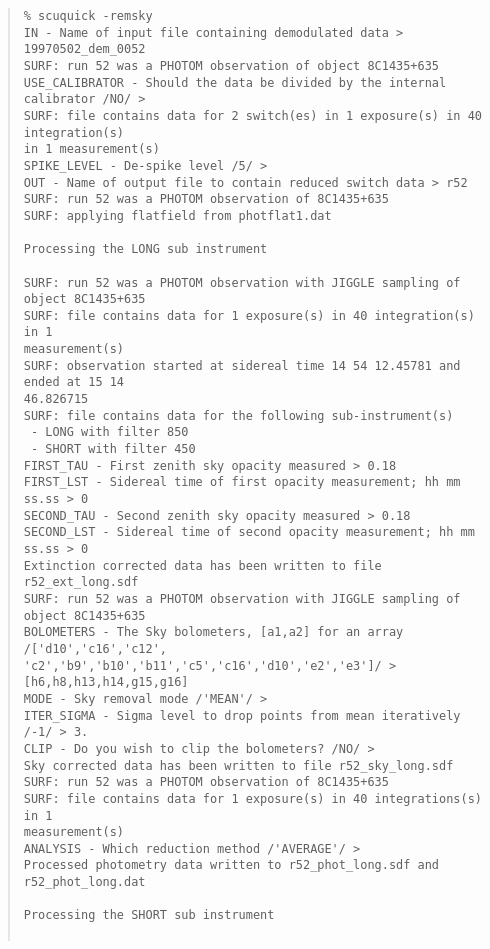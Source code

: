 \documentclass[twoside,11pt,fleqn]{article}
\newenvironment{myquote}{\begin{quote}\begin{small}}{\end{small}\end{quote}}
\begin{document}
\begin{myquote}
\begin{verbatim}
% scuquick -remsky
IN - Name of input file containing demodulated data > 19970502_dem_0052
SURF: run 52 was a PHOTOM observation of object 8C1435+635
USE_CALIBRATOR - Should the data be divided by the internal calibrator /NO/ > 
SURF: file contains data for 2 switch(es) in 1 exposure(s) in 40 integration(s)
in 1 measurement(s)
SPIKE_LEVEL - De-spike level /5/ > 
OUT - Name of output file to contain reduced switch data > r52
SURF: run 52 was a PHOTOM observation of 8C1435+635
SURF: applying flatfield from photflat1.dat
 
Processing the LONG sub instrument
 
SURF: run 52 was a PHOTOM observation with JIGGLE sampling of object 8C1435+635
SURF: file contains data for 1 exposure(s) in 40 integration(s) in 1
measurement(s)
SURF: observation started at sidereal time 14 54 12.45781 and ended at 15 14
46.826715
SURF: file contains data for the following sub-instrument(s)
 - LONG with filter 850
 - SHORT with filter 450
FIRST_TAU - First zenith sky opacity measured > 0.18
FIRST_LST - Sidereal time of first opacity measurement; hh mm ss.ss > 0
SECOND_TAU - Second zenith sky opacity measured > 0.18
SECOND_LST - Sidereal time of second opacity measurement; hh mm ss.ss > 0
Extinction corrected data has been written to file r52_ext_long.sdf
SURF: run 52 was a PHOTOM observation with JIGGLE sampling of object 8C1435+635
BOLOMETERS - The Sky bolometers, [a1,a2] for an array /['d10','c16','c12',
'c2','b9','b10','b11','c5','c16','d10','e2','e3']/ > [h6,h8,h13,h14,g15,g16]
MODE - Sky removal mode /'MEAN'/ > 
ITER_SIGMA - Sigma level to drop points from mean iteratively /-1/ > 3.
CLIP - Do you wish to clip the bolometers? /NO/ > 
Sky corrected data has been written to file r52_sky_long.sdf
SURF: run 52 was a PHOTOM observation of 8C1435+635
SURF: file contains data for 1 exposure(s) in 40 integrations(s) in 1
measurement(s)
ANALYSIS - Which reduction method /'AVERAGE'/ > 
Processed photometry data written to r52_phot_long.sdf and r52_phot_long.dat
 
Processing the SHORT sub instrument


\end{verbatim}
\end{myquote}
\end{document}

